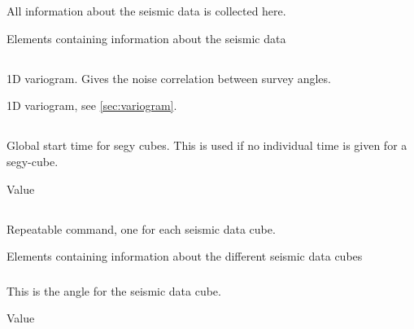 
 \section{\necessary} 
 \slist
   \item \Description All information about the seismic data is collected here.
   \item \Argument Elements containing information about the seismic data
   \item \Default
 \elist

 \subsection{}
 \slist
   \item \Description 1D variogram. Gives the noise correlation between survey angles.
   \item \Argument 1D variogram, see \autoref{sec:variogram}.
   \item \Default
 \elist

 \subsection{}
 \slist
   \item \Description Global start time for segy cubes. This is used if no individual time is given for a segy-cube.
   \item \Argument Value
   \item {}
 \elist

\subsection{\necessary}
 \slist
   \item \Description Repeatable command, one for each seismic data cube.
   \item \Argument Elements containing information about the different seismic data cubes
   \item \Default
 \elist

\subsubsection{\necessary}
 \slist
   \item \Description This is the angle for the seismic data cube.
   \item \Argument Value
   \item \Default
 \elist

